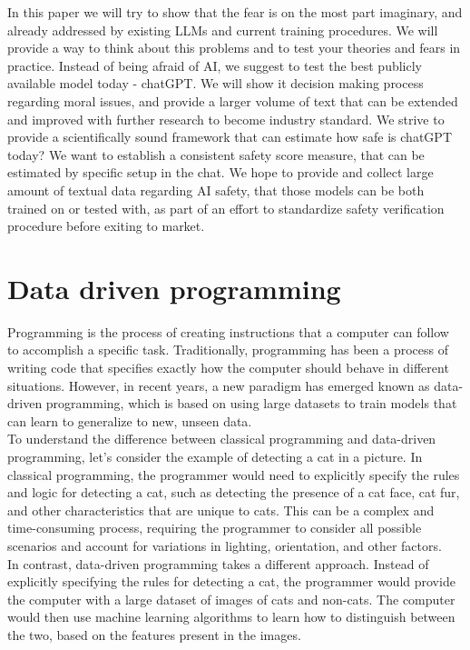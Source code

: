 \documentclass{article}
\begin{document}
In this paper we will try to show that the fear is on the most part imaginary, and already addressed by existing LLMs and current training procedures. We will provide a way to think about this problems and to test your theories and fears in practice. Instead of being afraid of AI, we suggest to test the best publicly available model today - chatGPT. We will show it decision making process regarding moral issues, and provide a larger volume of text that can be extended and improved with further research to become industry standard. We strive to provide a scientifically sound framework that can estimate how safe is chatGPT today? We want to establish a consistent safety score measure, that can be estimated by specific setup in the chat. We hope to provide and collect large amount of textual data regarding AI safety, that those models can be both trained on or tested with, as part of an effort to standardize safety verification procedure before exiting to market. 

\section{Data driven programming}

Programming is the process of creating instructions that a computer can follow to accomplish a specific task. Traditionally, programming has been a process of writing code that specifies exactly how the computer should behave in different situations. However, in recent years, a new paradigm has emerged known as data-driven programming, which is based on using large datasets to train models that can learn to generalize to new, unseen data.\cite{stutz2006get}\\

To understand the difference between classical programming and data-driven programming, let's consider the example of detecting a cat in a picture. In classical programming, the programmer would need to explicitly specify the rules and logic for detecting a cat, such as detecting the presence of a cat face, cat fur, and other characteristics that are unique to cats. This can be a complex and time-consuming process, requiring the programmer to consider all possible scenarios and account for variations in lighting, orientation, and other factors.\\

In contrast, data-driven programming takes a different approach. Instead of explicitly specifying the rules for detecting a cat, the programmer would provide the computer with a large dataset of images of cats and non-cats. The computer would then use machine learning algorithms to learn how to distinguish between the two, based on the features present in the images.\\
\end{document}

